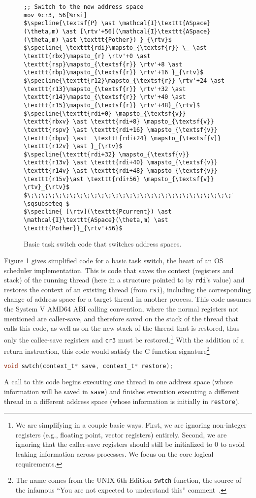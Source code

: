 \begin{figure}
\begin{lstlisting}
;; Switch to the new address space
mov %cr3, 56[%rsi]
$\specline{\textsf{P} \ast \mathcal{I}\texttt{ASpace}(\theta,m) \ast [\rtv'+56](\mathcal{I}\texttt{ASpace}(\theta,m) \ast \texttt{Pother}) }_{\rtv}$
$\specline{ \texttt{rdi}\mapsto_{\textsf{r}} \_ \ast \texttt{rbx}\mapsto_{r} \rtv'+0 \ast  \texttt{rsp}\mapsto_{\textsf{r}} \rtv'+8 \ast \texttt{rbp}\mapsto_{\textsf{r}} \rtv'+16 }_{\rtv}$
$\specline{\texttt{r12}\mapsto_{\textsf{r}} \rtv'+24 \ast \texttt{r13}\mapsto_{\textsf{r}} \rtv'+32 \ast \texttt{r14}\mapsto_{\textsf{r}} \rtv'+40 \ast \texttt{r15}\mapsto_{\textsf{r}} \rtv'+48}_{\rtv}$
$\specline{\texttt{rdi+0} \mapsto_{\textsf{v}} \texttt{rbxv} \ast \texttt{rdi+8} \mapsto_{\textsf{v}} \texttt{rspv} \ast \texttt{rdi+16} \mapsto_{\textsf{v}} \texttt{rbpv} \ast  \texttt{rdi+24} \mapsto_{\textsf{v}} \texttt{r12v} \ast }_{\rtv}$
$\specline{\texttt{rdi+32} \mapsto_{\textsf{v}} \texttt{r13v} \ast \texttt{rdi+40} \mapsto_{\textsf{v}} \texttt{r14v} \ast \texttt{rdi+48} \mapsto_{\textsf{v}} \texttt{r15v}\ast \texttt{rdi+56} \mapsto_{\textsf{v}} \rtv}_{\rtv}$
$\;\;\;\;\;\;\;\;\;\;\;\;\;\;\;\;\;\;\;\;\;\;\;\;\;\;\;\;\;\;\;\;\;\;\;\;\;\;\;\;\;\;\;\; \sqsubseteq $
$\specline{ [\rtv](\texttt{Pcurrent}) \ast \mathcal{I}\texttt{ASpace}(\theta,m) \ast \texttt{Pother}}_{\rtv'+56}$
\end{lstlisting}
\caption{Basic task switch code that switches address spaces.}
\label{fig:swtch}
\end{figure}

Figure \ref{fig:swtch} gives simplified code for a basic task switch, the heart of an OS scheduler implementation. This is code that saves the context (registers and stack) of the running thread (here in a structure pointed to by \lstinline|rdi|'s value) and restores the context of an existing thread (from \lstinline|rsi|), including the corresponding change of address space for a target thread in another process.
This code assumes the System V AMD64 ABI calling convention, where the normal registers not mentioned are caller-save, and therefore saved on the stack of the thread that calls this code, as well as on the new stack of the thread that is restored, thus only the callee-save registers and \texttt{cr3} must be restored.\footnote{We are simplifying in a couple basic ways. First, we are ignoring non-integer registers (e.g., floating point, vector registers) entirely. Second, we are ignoring that the caller-save registers should still be initialized to 0 to avoid leaking information across processes. We focus on the core logical requirements.}
With the addition of a return instruction, this code would satisfy the C function signature\footnote{The name comes from the UNIX 6th Edition \lstinline|swtch| function, the source of the infamous ``You are not expected to understand this'' comment~\cite{lions1996lions}.}
\begin{lstlisting}[language=C]
void swtch(context_t* save, context_t* restore);
\end{lstlisting}
A call to this code begins executing one thread in one address space (whose information will be saved in \lstinline[language=C]|save|) and finishes execution executing a different thread in a different address space (whose information is initially in \lstinline[language=C]|restore|).

